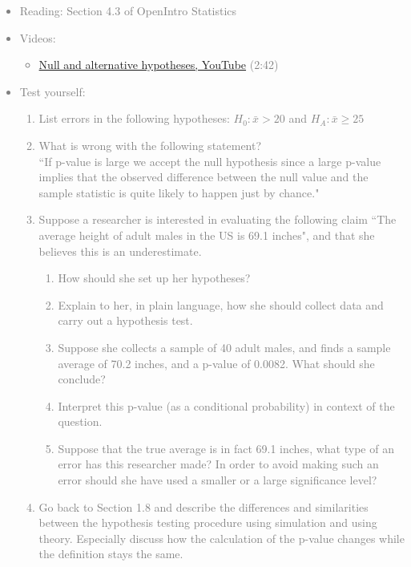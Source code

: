 \documentclass[11pt]{article}
\newcommand{\gray}[1]{\textcolor{gray}{#1}}
\begin{document}
\gray{
{\it
\vspace{-0.5cm}
\begin{itemize}
\renewcommand{\labelitemi}{{\textcolor{dark}{$\ast$}}}
\item Reading: Section 4.3 of OpenIntro Statistics
\item Videos:
\begin{itemize}
\item \href{http://www.youtube.com/watch?v=5N7L1cGCL-w}{Null and alternative hypotheses, YouTube} (2:42)
\end{itemize}
\item Test yourself: 
{\small
\begin{enumerate}
\item List errors in the following hypotheses: $H_0: \bar{x} > 20$ and $H_A: \bar{x} \ge 25$
\item What is wrong with the following statement? \\
``If p-value is large we accept the null hypothesis since a large p-value implies that the observed difference between the null value and the sample statistic is quite likely to happen just by chance."
\item Suppose a researcher is interested in evaluating the following claim ``The average height of adult males in the US is 69.1 inches", and that she believes this is an underestimate.
\begin{enumerate}
\item How should she set up her hypotheses? 
\item Explain to her, in plain language, how she should collect data and carry out a hypothesis test.
\item Suppose she collects a sample of 40 adult males, and finds a sample average of 70.2 inches, and a p-value of 0.0082. What should she conclude?
\item Interpret this p-value (as a conditional probability) in context of the question.
\item Suppose that the true average is in fact 69.1 inches, what type of an error has this researcher made? In order to avoid making such an error should she have used a smaller or a large significance level?
\end{enumerate}
\item Go back to Section 1.8 and describe the differences and similarities between the hypothesis testing procedure using simulation and using theory. Especially discuss how the calculation of the p-value changes while the definition stays the same.
\end{enumerate}
}
\end{itemize}
}}
\end{document}
